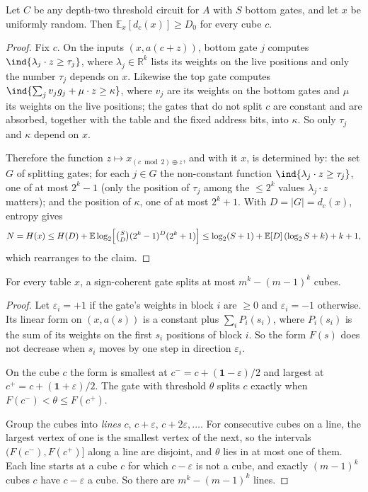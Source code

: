 \begin{lemma}\label{lem:entropy}
Let $C$ be any depth-two threshold circuit for $A$ with $S$ bottom gates, and
let $x$ be uniformly random. Then $\mathbb E_x[d_c(x)]\ge D_0$ for every cube
$c$.
\end{lemma}
\begin{proof}
Fix $c$. On the inputs $(x,a(c+z))$, bottom gate $j$ computes
$\ind{\lambda_j\cdot z\ge\tau_j}$, where $\lambda_j\in\mathbb R^k$ lists its
weights on the live positions and only the number $\tau_j$ depends on $x$.
Likewise the top gate computes
$\ind{\sum_jv_jg_j+\mu\cdot z\ge\kappa}$, where $v_j$ are its weights on the
bottom gates and $\mu$ its weights on the live positions; the gates that
do not split $c$ are constant and are absorbed, together with the table and
the fixed address bits, into $\kappa$. So only $\tau_j$ and $\kappa$ depend
on $x$.

Therefore the function $z\mapsto x_{(c\bmod2)\oplus z}$, and with it $x$, is
determined by: the set $G$ of splitting gates; for each $j\in G$ the
non-constant function $\ind{\lambda_j\cdot z\ge\tau_j}$, one of at most $2^k-1$
(only the position of $\tau_j$ among the $\le2^k$ values $\lambda_j\cdot z$
matters); and the position of $\kappa$, one of at most $2^k+1$. With
$D=|G|=d_c(x)$, entropy gives
\[
N=H(x)\le H(D)+\mathbb E\log_2\Bigl[\tbinom SD(2^k-1)^D(2^k+1)\Bigr]
\le\log_2(S+1)+\mathbb E[D]\,(\log_2S+k)+k+1,
\]
which rearranges to the claim.
\end{proof}

\begin{lemma}\label{lem:diag}
For every table $x$, a sign-coherent gate splits at most $m^k-(m-1)^k$ cubes.
\end{lemma}
\begin{proof}
Let $\varepsilon_i=+1$ if the gate's weights in block $i$ are $\ge0$ and
$\varepsilon_i=-1$ otherwise. Its linear form on $(x,a(s))$ is a constant plus
$\sum_iP_i(s_i)$, where $P_i(s_i)$ is the sum of its weights on the first
$s_i$ positions of block $i$. So the form $F(s)$ does not decrease when
$s_i$ moves by one step in direction $\varepsilon_i$.

On the cube $c$ the form is smallest at $c^-=c+(\mathbf1-\varepsilon)/2$ and
largest at $c^+=c+(\mathbf1+\varepsilon)/2$. The gate with threshold $\theta$
splits $c$ exactly when $F(c^-)<\theta\le F(c^+)$.

Group the cubes into \emph{lines} $c,\,c+\varepsilon,\,c+2\varepsilon,\dots$.
For consecutive cubes on a line, the largest vertex of one is the smallest
vertex of the next, so the intervals $(F(c^-),F(c^+)]$ along a line are
disjoint, and $\theta$ lies in at most one of them. Each line starts at a cube
$c$ for which $c-\varepsilon$ is not a cube, and exactly $(m-1)^k$ cubes $c$
have $c-\varepsilon$ a cube. So there are $m^k-(m-1)^k$ lines.
\end{proof}

